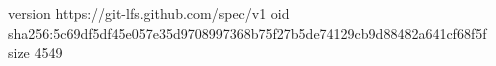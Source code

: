 version https://git-lfs.github.com/spec/v1
oid sha256:5c69df5df45e057e35d9708997368b75f27b5de74129cb9d88482a641cf68f5f
size 4549

